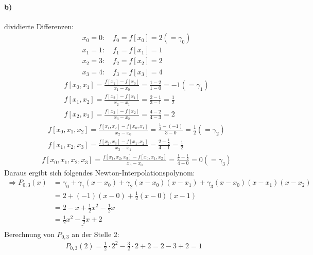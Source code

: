 \paragraph*{b)}dividierte Differenzen:\\
\begin{align*}
&x_0=0: \quad f_0=f[x_0]=2(=\gamma_0)\\
&x_1=1: \quad f_1=f[x_1]=1\\
&x_2=3: \quad f_2=f[x_2]=2\\
&x_3=4: \quad f_3=f[x_3]=4
\end{align*}
\begin{align*}
&f[x_0,x_1]=\frac{f[x_1]-f[x_0]}{x_1-x_0}=\frac{1-2}{1-0}=-1(=\gamma_1)\\
&f[x_1,x_2]=\frac{f[x_2]-f[x_1]}{x_2-x_1}=\frac{2-1}{3-1}=\frac{1}{2}\\
&f[x_2,x_3]=\frac{f[x_3]-f[x_2]}{x_3-x_2}=\frac{4-2}{4-3}=2
\end{align*}
\begin{align*}
&f[x_0,x_1,x_2]=\frac{f[x_1,x_2]-f[x_0,x_1]}{x_2-x_0}=\frac{\frac{1}{2}-(-1)}{3-0}=\frac{1}{2}(=\gamma_2)\\
&f[x_1,x_2,x_3]=\frac{f[x_2,x_3]-f[x_1,x_2]}{x_3-x_1}=\frac{2-\frac{1}{2}}{4-1}=\frac{1}{2}
\end{align*}
\begin{align*}
&f[x_0,x_1,x_2,x_3]=\frac{f[x_1,x_2,x_3]-f[x_0,x_1,x_2]}{x_3-x_0}=\frac{\frac{1}{2}-\frac{1}{2}}{4-0}=0(=\gamma_3)
\end{align*}
Daraus ergibt sich folgendes Newton-Interpolationspolynom:
\begin{align*}
\Rightarrow P_{0,3}(x)&=\gamma_0+\gamma_1 (x-x_0)+\gamma_2(x-x_0)(x-x_1)+\gamma_3(x-x_0)(x-x_1)(x-x_2)\\
&=2+(-1)(x-0)+\frac{1}{2}(x-0)(x-1)\\
&=2-x+\frac{1}{2}x^2-\frac{1}{2}x\\
&=\underline{\underline{\frac{1}{2}x^2-\frac{3}{2}x+2}}
\end{align*}
Berechnung von $P_{0,3}$ an der Stelle 2:
\begin{align*}
P_{0,3}(2)=\frac{1}{2}\cdot 2^2-\frac{3}{2}\cdot 2+2=2-3+2=1
\end{align*}
